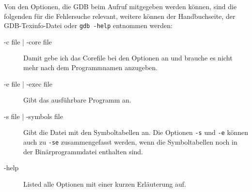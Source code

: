 \begin{normaltext}
  Von den Optionen, die GDB beim Aufruf mitgegeben werden können, sind die
  folgenden für die Fehlersuche relevant, weitere können der Handbuchseite,
  der GDB-Texinfo-Datei oder \verb?gdb -help? entnommen werden:
  \begin{description}
    \item[-c file | -core file] Damit gebe ich das Corefile bei den Optionen
      an und brauche es nicht mehr nach dem Programmnamen anzugeben.
    \item[-e file | -exec file] Gibt das ausführbare Programm an.
    \item[-s file | -symbols file] Gibt die Datei mit den Symboltabellen an.
      Die Optionen \verb?-s? und \verb?-e? können auch zu \verb?-se?
      zusammengefasst werden, wenn die Symboltabellen noch in der
      Binärprogrammdatei enthalten sind.
    \item[-help] Listed alle Optionen mit einer kurzen Erläuterung auf.
  \end{description}


\end{normaltext}
